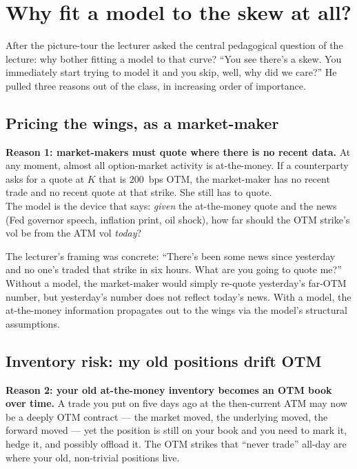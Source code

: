 \section{Why fit a model to the skew at all?}\label{L7-sec:whymodel}

After the picture-tour the lecturer asked the central pedagogical
question of the lecture: why bother fitting a model to that curve?
``You see there's a skew. You immediately start trying to model it
and you skip, well, why did we care?'' He pulled three reasons out
of the class, in increasing order of importance.

\subsection{Pricing the wings, as a market-maker}\label{L7-sec:wings}

\begin{keyblock}
\textbf{Reason 1: market-makers must quote where there is no recent data.}
At any moment, almost all option-market activity is at-the-money. If a
counterparty asks for a quote at $K$ that is $200$~bps OTM, the
market-maker has no recent trade and no recent quote at that strike.
She still has to quote.\\
The model is the device that says: \emph{given} the at-the-money quote
and the news (Fed governor speech, inflation print, oil shock), how far
should the OTM strike's vol be from the ATM vol \emph{today}?
\end{keyblock}

The lecturer's framing was concrete: ``There's been some news since
yesterday and no one's traded that strike in six hours. What are you
going to quote me?'' Without a model, the market-maker would simply
re-quote yesterday's far-OTM number, but yesterday's number does not
reflect today's news. With a model, the at-the-money information
propagates out to the wings via the model's structural assumptions.

\subsection{Inventory risk: my old positions drift OTM}\label{L7-sec:inventory}

\begin{keyblock}
\textbf{Reason 2: your old at-the-money inventory becomes an OTM book
over time.}
A trade you put on five days ago at the then-current ATM may now be a
deeply OTM contract --- the market moved, the underlying moved, the
forward moved --- yet the position is still on your book and you need
to mark it, hedge it, and possibly offload it. The OTM strikes that
``never trade'' all-day are where your old, non-trivial positions
live.
\end{keyblock}

